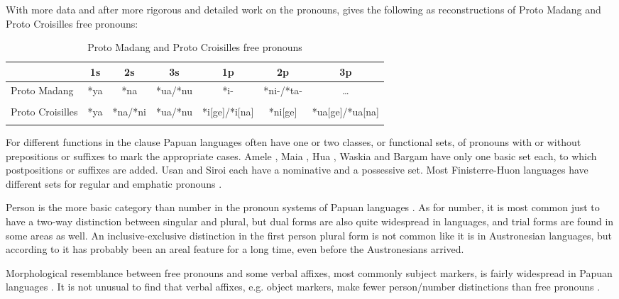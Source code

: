 With more data and after more rigorous and detailed work on the  pronouns, \citet[5]{Ross1995} gives the following as reconstructions of Proto Madang and Proto Croisilles free pronouns:

\begin{table}
\begin{tabular}{lcccccc}
\mytoprule
 & 1s & 2s & 3s & 1p & 2p & 3p\\ 
\midrule
\midrule
\parbox{1.1cm}{Proto Madang} & *ya & *na & *ua/*nu & *i- & *ni-/*ta- & {\dots}\\ 
\\
\parbox{1.1cm}{Proto Croisilles} & *ya & *na/*ni & *ua/*nu & *i[ge]/*i[na] & *ni[ge] & *ua[ge]/*ua[na]\\
\mybottomrule
\mybottomrule
\end{tabular}
\caption{Proto Madang and Proto Croisilles free pronouns}
\label{tab:8}
\end{table}

For different functions in the clause Papuan languages often have one or two classes, or functional sets, of pronouns with or without prepositions or suffixes to mark the appropriate cases. Amele \citep{Roberts1987}, Maia \citep[71]{Hardin2002}, Hua \citep[215]{Haiman1980}, Waskia \citep[53]{RossEtAl1978}%
 and Bargam \citep[29]{Hepner2002} have only one basic set each, to which postpositions or suffixes are added. Usan \citep{Reesink1987} and Siroi \citep{Wells1979} each have a nominative and a possessive set. Most Finisterre-Huon languages have different sets for regular and emphatic pronouns \citep{McElhanon1973}.

Person is the more basic category than number in the pronoun systems of Papuan languages \citep[69]{Foley1986}. As for number, it is most common just to have a two-way distinction between singular and plural, but dual forms are also quite widespread in  languages, and trial forms are found in some areas as well. An inclusive-exclusive distinction in the first person plural form is not common \citep[60]{Wurm1982} like it is in Austronesian languages, but according to \citet[56]{Ross2005} it has probably been an areal feature for a long time, even before the Austronesians arrived. 

Morphological resemblance between free pronouns and some verbal affixes, most commonly subject markers, is fairly widespread in Papuan languages \citep{Franklin1979}. It is not unusual to find that verbal affixes, e.g. object markers, make fewer person/number distinctions than free pronouns \citep[67]{Foley1986}.

